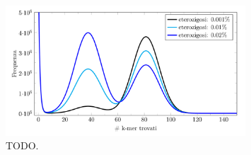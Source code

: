 \documentclass[crop=false, class=book]{standalone}
\begin{document}
	
	
	
	\begin{figure}
		\centering
		\includegraphics[width=0.8\textwidth]{capitoli/introduzione/kmerprofile.png}
		\caption{TODO.}
		\label{fig:kmerprofile}
	\end{figure}

	
	
	
	
\end{document}
